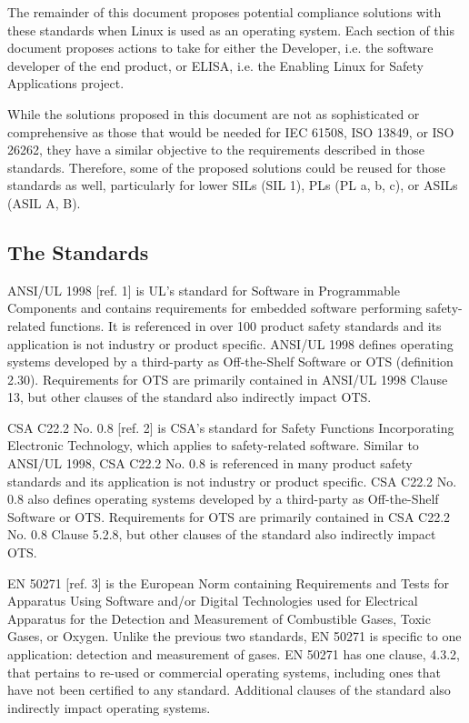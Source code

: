 \documentclass[12pt]{../Common_files/ElisaPaper}
\begin{document}
The remainder of this document proposes potential compliance solutions with these standards when Linux is used as an operating system.  
Each section of this document proposes actions to take for either the Developer, i.e. the software developer of the end product, or ELISA, i.e. the Enabling Linux for Safety Applications project. 

While the solutions proposed in this document are not as sophisticated or comprehensive as those that would be needed for IEC 61508, ISO 13849, or ISO 26262, they have a similar objective to the requirements described in those standards.  
Therefore, some of the proposed solutions could be reused for those standards as well, particularly for lower SILs (SIL 1), PLs (PL a, b, c), or ASILs (ASIL A, B).

\subsection{The Standards}
ANSI/UL 1998 [ref. 1] is UL's standard for Software in Programmable Components and contains requirements for embedded software performing safety-related functions.  
It is referenced in over 100 product safety standards and its application is not industry or product specific.  
ANSI/UL 1998 defines operating systems developed by a third-party as Off-the-Shelf Software or OTS (definition 2.30).  
Requirements for OTS are primarily contained in ANSI/UL 1998 Clause 13, but other clauses of the standard also indirectly impact OTS.

CSA C22.2 No. 0.8 [ref. 2] is CSA's standard for Safety Functions Incorporating Electronic Technology, which applies to safety-related software.
Similar to ANSI/UL 1998, CSA C22.2 No. 0.8 is referenced in many product safety standards and its application is not industry or product specific.
CSA C22.2 No. 0.8 also defines operating systems developed by a third-party as Off-the-Shelf Software or OTS.  
Requirements for OTS are primarily contained in CSA C22.2 No. 0.8 Clause 5.2.8, but other clauses of the standard also indirectly impact OTS.

EN 50271 [ref. 3] is the European Norm containing Requirements and Tests for Apparatus Using Software and/or Digital Technologies used for Electrical Apparatus for the Detection and Measurement of Combustible Gases, Toxic Gases, or Oxygen.  
Unlike the previous two standards, EN 50271 is specific to one application: detection and measurement of gases.  
EN 50271 has one clause, 4.3.2, that pertains to re-used or commercial operating systems, including ones that have not been certified to any standard.  
Additional clauses of the standard also indirectly impact operating systems.
\end{document}

